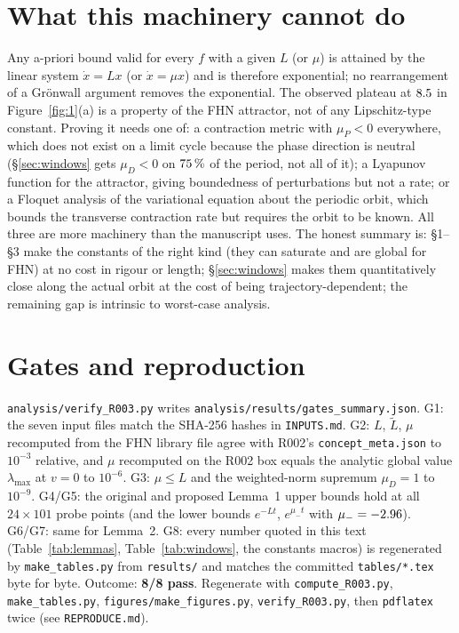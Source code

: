 \documentclass[10pt]{article}
\begin{document}
\section{What this machinery cannot do}\label{sec:limits}
Any a-priori bound valid for every $f$ with a given $L$ (or $\mu$) is attained by the linear system $\dot x=Lx$ (or $\dot x=\mu x$) and is therefore exponential; no rearrangement of a Gr\"onwall argument removes the exponential. The observed plateau at $8.5$ in Figure~\ref{fig:1}(a) is a property of the FHN attractor, not of any Lipschitz-type constant. Proving it needs one of: a contraction metric with $\mu_P<0$ everywhere, which does not exist on a limit cycle because the phase direction is neutral (\S\ref{sec:windows} gets $\mu_D<0$ on $75\,\%$ of the period, not all of it); a Lyapunov function for the attractor, giving boundedness of perturbations but not a rate; or a Floquet analysis of the variational equation about the periodic orbit, which bounds the transverse contraction rate but requires the orbit to be known. All three are more machinery than the manuscript uses. The honest summary is: \S1--\S3 make the constants of the right kind (they can saturate and are global for FHN) at no cost in rigour or length; \S\ref{sec:windows} makes them quantitatively close along the actual orbit at the cost of being trajectory-dependent; the remaining gap is intrinsic to worst-case analysis.

\section{Gates and reproduction}\label{sec:gates}
\texttt{analysis/verify\_R003.py} writes \texttt{analysis/results/gates\_summary.json}. G1: the seven input files match the SHA-256 hashes in \texttt{INPUTS.md}. G2: $L$, $\tilde L$, $\mu$ recomputed from the FHN library file agree with R002's \texttt{concept\_meta.json} to $10^{-3}$ relative, and $\mu$ recomputed on the R002 box equals the analytic global value $\lambda_{\max}$ at $v=0$ to $10^{-6}$. G3: $\mu\le L$ and the weighted-norm supremum $\mu_D=1$ to $10^{-9}$. G4/G5: the original and proposed Lemma~1 upper bounds hold at all $24\times101$ probe points (and the lower bounds $e^{-Lt}$, $e^{\mu_-t}$ with $\mu_-=-2.96$). G6/G7: same for Lemma~2. G8: every number quoted in this text (Table~\ref{tab:lemmas}, Table~\ref{tab:windows}, the constants macros) is regenerated by \texttt{make\_tables.py} from \texttt{results/} and matches the committed \texttt{tables/*.tex} byte for byte. Outcome: \textbf{8/8 pass}. Regenerate with \texttt{compute\_R003.py}, \texttt{make\_tables.py}, \texttt{figures/make\_figures.py}, \texttt{verify\_R003.py}, then \texttt{pdflatex} twice (see \texttt{REPRODUCE.md}).
\end{document}
